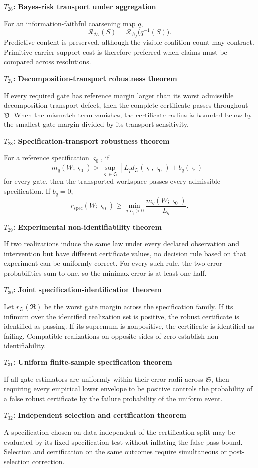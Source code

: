 \documentclass[11pt,letterpaper]{article}
\newcommand{\Risk}{\mathcal R}
\newcommand{\subtopic}[1]{%
 \vspace{0.45em}
 {\bfseries\color{AccentColor} #1\par}
}
\theoremstyle{plain}
\theoremstyle{definition}
\begin{document}
\subtopic{\(T_{26}\): Bayes-risk transport under aggregation}
For an information-faithful coarsening map \(q\),
\[
\boxed{
\Risk_{\mathcal D_c}(S)
=
\Risk_{\mathcal D_f}\bigl(q^{-1}(S)\bigr).
}
\]
Predictive content is preserved, although the visible coalition count may
contract. Primitive-carrier support cost is therefore preferred when claims
must be compared across resolutions.

\subtopic{\(T_{27}\): Decomposition-transport robustness theorem}
If every required gate has reference margin larger than its worst admissible
decomposition-transport defect, then the complete certificate passes
throughout \(\mathfrak D\). When the mismatch term vanishes, the certificate
radius is bounded below by the smallest gate margin divided by its transport
sensitivity.

\subtopic{\(T_{28}\): Specification-transport robustness theorem}
For a reference specification \(\varsigma_0\), if
\[
m_q(W;\varsigma_0)
>
\sup_{\varsigma\in\mathfrak S}
\left[
L_qd_{\mathfrak S}(\varsigma,\varsigma_0)+b_q(\varsigma)
\right]
\]
for every gate, then the transported workspace passes every admissible
specification. If \(b_q=0\),
\[
r_{\mathrm{spec}}(W;\varsigma_0)
\geq
\min_{q:L_q>0}\frac{m_q(W;\varsigma_0)}{L_q}.
\]

\subtopic{\(T_{29}\): Experimental non-identifiability theorem}
If two realizations induce the same law under every declared observation and
intervention but have different certificate values, no decision rule based on
that experiment can be uniformly correct. For every such rule, the two error
probabilities sum to one, so the minimax error is at least one half.

\subtopic{\(T_{30}\): Joint specification-identification theorem}
Let \(r_{\mathfrak S}(\mathfrak R)\) be the worst gate margin across the
specification family. If its infimum over the identified realization set is
positive, the robust certificate is identified as passing. If its supremum is
nonpositive, the certificate is identified as failing. Compatible realizations
on opposite sides of zero establish non-identifiability.

\subtopic{\(T_{31}\): Uniform finite-sample specification theorem}
If all gate estimators are uniformly within their error radii across
\(\mathfrak S\), then requiring every empirical lower envelope to be positive
controls the probability of a false robust certificate by the failure
probability of the uniform event.

\subtopic{\(T_{32}\): Independent selection and certification theorem}
A specification chosen on data independent of the certification split may be
evaluated by its fixed-specification test without inflating the false-pass
bound. Selection and certification on the same outcomes require simultaneous
or post-selection correction.
\end{document}
